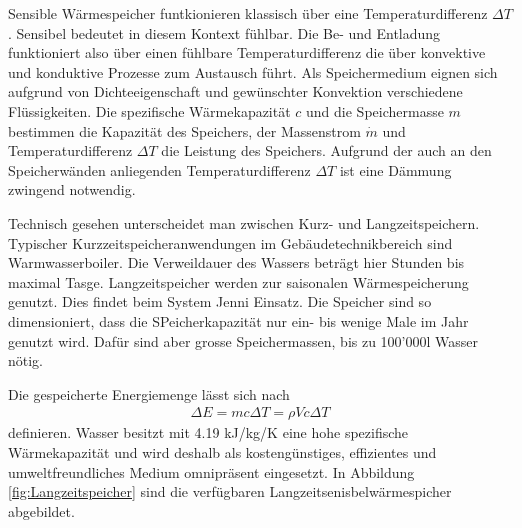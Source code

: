 \documentclass[11pt,a4paper]{scrartcl}
\begin{document}
Sensible Wärmespeicher funtkionieren klassisch über eine Temperaturdifferenz
$\Delta T$. Sensibel bedeutet in diesem Kontext \flqq fühlbar\frqq{}. Die
Be- und Entladung funktioniert also über einen \flqq fühlbare\frqq{}
Temperaturdifferenz die über konvektive und konduktive Prozesse zum Austausch
führt. Als Speichermedium eignen sich aufgrund von Dichteeigenschaft und
gewünschter Konvektion verschiedene Flüssigkeiten. Die spezifische
Wärmekapazität $c$ und die Speichermasse $m$ bestimmen die Kapazität des
Speichers, der Massenstrom $\dot{m}$ und Temperaturdifferenz $\Delta T$ die
Leistung des Speichers. Aufgrund der auch an den Speicherwänden anliegenden
Temperaturdifferenz $\Delta T$ ist eine Dämmung zwingend notwendig. 

Technisch gesehen unterscheidet man zwischen Kurz- und Langzeitspeichern.
Typischer Kurzzeitspeicheranwendungen im Gebäudetechnikbereich sind
Warmwasserboiler. Die Verweildauer des Wassers beträgt hier Stunden bis maximal
Tasge. Langzeitspeicher werden zur saisonalen Wärmespeicherung genutzt. Dies
findet beim System Jenni Einsatz. Die Speicher sind so dimensioniert, dass die
SPeicherkapazität nur ein- bis wenige Male im Jahr genutzt wird. Dafür sind aber
grosse Speichermassen, bis zu 100'000l Wasser nötig.

Die gespeicherte Energiemenge lässt sich nach
\begin{align}
\Delta E = mc\Delta T = \rho Vc \Delta T
\end{align}
definieren. Wasser besitzt mit 4.19 kJ/kg/K eine hohe spezifische
Wärmekapazität und wird deshalb als kostengünstiges, effizientes und
umweltfreundliches Medium omnipräsent eingesetzt.
In Abbildung \ref{fig:Langzeitspeicher} sind die verfügbaren
Langzeitsenisbelwärmespicher abgebildet.
\end{document}
